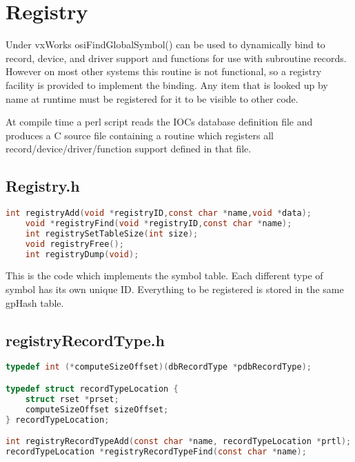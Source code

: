 \chapter{Registry}
\label{Registry}

Under vxWorks osiFindGlobalSymbol() can be used to dynamically bind to record, device, and driver support and 
functions for use with subroutine records. However on most other systems this routine is not functional, so a registry 
facility is provided to implement the binding. Any item that is looked up by name at runtime must be registered for it to be 
visible to other code.

At compile time a perl script reads the IOCs database definition file and produces a C source file containing a routine 
which registers all record/device/driver/function support defined in that file.

\section{Registry.h}

\begin{lstlisting}[language=C]
int registryAdd(void *registryID,const char *name,void *data);
    void *registryFind(void *registryID,const char *name);
    int registrySetTableSize(int size);
    void registryFree();
    int registryDump(void);
\end{lstlisting}

This is the code which implements the symbol table. Each different type of symbol has its own unique ID. Everything to 
be registered is stored in the same gpHash table.

\section{registryRecordType.h}

\begin{lstlisting}[language=C]
typedef int (*computeSizeOffset)(dbRecordType *pdbRecordType);

typedef struct recordTypeLocation {
    struct rset *prset;
    computeSizeOffset sizeOffset;
} recordTypeLocation;

int registryRecordTypeAdd(const char *name, recordTypeLocation *prtl);
recordTypeLocation *registryRecordTypeFind(const char *name);
\end{lstlisting}

